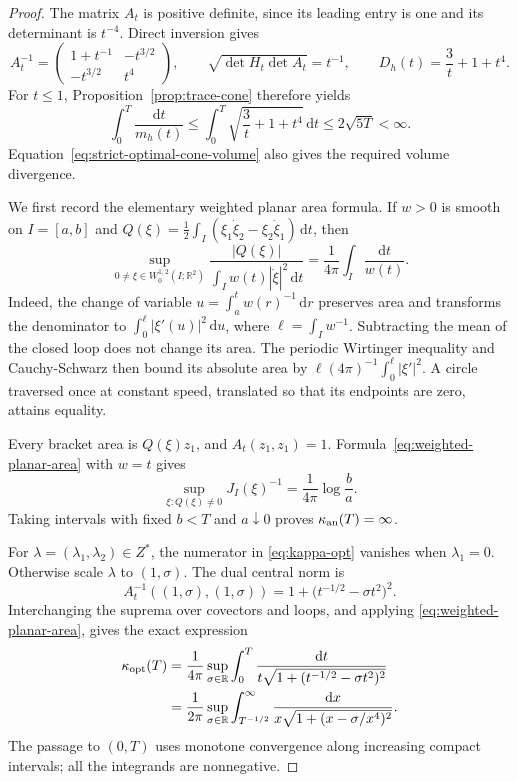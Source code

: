 \documentclass[10pt,a4paper]{article}
\numberwithin{equation}{section}
\theoremstyle{definition}
\theoremstyle{remark}
\newcommand{\dd}{\mathrm d}
\begin{document}
\begin{proof}
The matrix $A_t$ is positive definite, since its leading entry is one
and its determinant is $t^{-4}$.  Direct inversion gives
\begin{equation}
 A_t^{-1}=\begin{pmatrix}
 1+t^{-1}&-t^{3/2}\\ -t^{3/2}&t^4
 \end{pmatrix},\qquad
 \sqrt{\det H_t\det A_t}=t^{-1},\qquad
 D_h(t)=\frac3t+1+t^4.
 \label{eq:strict-optimal-cone-volume}
\end{equation}
For $t\le1$, Proposition~\ref{prop:trace-cone} therefore yields
\[
 \int_0^T\frac{\dd t}{m_h(t)}
 \le\int_0^T\sqrt{\frac3t+1+t^4}\,\dd t
 \le2\sqrt{5T}<\infty.
\]
Equation~\eqref{eq:strict-optimal-cone-volume} also gives the required
volume divergence.

We first record the elementary weighted planar area formula.  If
$w>0$ is smooth on $I=[a,b]$ and
$Q(\xi)=\frac12\int_I(\xi_1\dot\xi_2-\xi_2\dot\xi_1)\,\dd t$,
then
\begin{equation}
 \sup_{0\ne\xi\in W^{1,2}_0(I;\mathbb R^2)}
 \frac{|Q(\xi)|}{\int_Iw(t)|\dot\xi|^2\,\dd t}
 =\frac1{4\pi}\int_I\frac{\dd t}{w(t)}.
 \label{eq:weighted-planar-area}
\end{equation}
Indeed, the change of variable $u=\int_a^t w(r)^{-1}\,\dd r$
preserves area and transforms the denominator to
$\int_0^\ell|\xi'(u)|^2\,\dd u$, where
$\ell=\int_Iw^{-1}$.
Subtracting the mean of the closed loop does not change its area.
The periodic Wirtinger inequality and Cauchy-Schwarz then bound its
absolute area by $\ell(4\pi)^{-1}\int_0^\ell|\xi'|^2$.
A circle traversed once at constant speed, translated so that its
endpoints are zero, attains equality.

Every bracket area is $Q(\xi)z_1$, and $A_t(z_1,z_1)=1$.
Formula~\eqref{eq:weighted-planar-area} with $w=t$ gives
\[
 \sup_{\xi:Q(\xi)\ne0}J_I(\xi)^{-1}
 =\frac1{4\pi}\log\frac ba.
\]
Taking intervals with fixed $b<T$ and $a\downarrow0$ proves
$\kappa_{\rm an}(T)=\infty$.

For $\lambda=(\lambda_1,\lambda_2)\in Z^*$, the numerator in
\eqref{eq:kappa-opt} vanishes when $\lambda_1=0$.  Otherwise scale
$\lambda$ to $(1,\sigma)$.  The dual central norm is
\[
 A_t^{-1}((1,\sigma),(1,\sigma))
 =1+\bigl(t^{-1/2}-\sigma t^2\bigr)^2.
\]
Interchanging the suprema over covectors and loops, and applying
\eqref{eq:weighted-planar-area}, gives the exact expression
\begin{align}
 \kappa_{\rm opt}(T)
 &=\frac1{4\pi}\sup_{\sigma\in\mathbb R}
   \int_0^T\frac{\dd t}
    {t\sqrt{1+(t^{-1/2}-\sigma t^2)^2}}\notag\\
 &=\frac1{2\pi}\sup_{\sigma\in\mathbb R}
   \int_{T^{-1/2}}^\infty
   \frac{\dd x}{x\sqrt{1+(x-\sigma/x^4)^2}}.
 \label{eq:strict-optimal-exact}
\end{align}
The passage to $(0,T)$ uses monotone convergence along increasing
compact intervals; all the integrands are nonnegative.


\end{proof}
\end{document}
